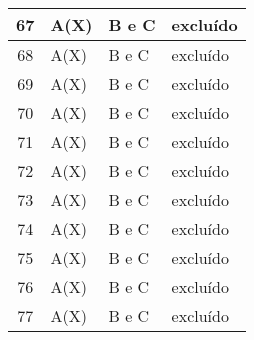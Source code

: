 \documentclass[12pt, a4paper]{article}
\begin{document}
\begin{longtable}{|c|l|l|l|}
		67	&	A(X)&	B e C	& excluído	\\  \hline
		68	&	A(X)&	B e C	& excluído	\\  \hline
		69	&	A(X)&	B e C	& excluído	\\  \hline
		70	&	A(X)&	B e C	& excluído	\\  	\hline		
		71	&	A(X)	&	B e C	& excluído	\\  	\hline		
		72	&	A(X)&	B e C	& excluído	\\  \hline
		73	&	A(X)&	B e C	& excluído	\\  \hline
		74	&	A(X)&	B e C	& excluído	\\  \hline
		75	&	A(X)&	B e C	& excluído	\\  \hline
		76	&	A(X)&	B e C	& excluído	\\  \hline
		77	&	A(X)&	B e C	& excluído	\\ \hline

\end{longtable}

\end{document}
